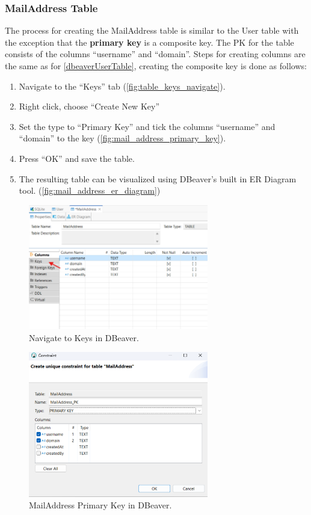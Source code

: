 \documentclass[a4paper,11pt,oneside]{article}
\begin{document}
\begin{sloppypar}
\subsubsection{MailAddress Table}
\label{dbeaverMailAddressTable}
The process for creating the MailAddress table is similar to the User table with the exception that the \textbf{primary key} is a composite key. The PK for the table consists of the columns ``username'' and ``domain''. Steps for creating columns are the same as for \ref{dbeaverUserTable}, creating the composite key is done as follows:
\begin{enumerate}
  \item Navigate to the ``Keys'' tab (\autoref{fig:table_keys_navigate}).
  \item Right click, choose ``Create New Key''
  \item Set the type to ``Primary Key'' and tick the columns ``username'' and ``domain'' to the key (\autoref{fig:mail_address_primary_key}).
  \item Press ``OK'' and save the table.
  \item The resulting table can be visualized using DBeaver's built in ER Diagram tool. (\autoref{fig:mail_address_er_diagram})
\end{enumerate}

\begin{figure}[!htb]
  \centering
  \includegraphics[width=0.7\textwidth]{dbeaver/table_keys_navigate.png}
  \caption{Navigate to Keys in DBeaver.}
  \label{fig:table_keys_navigate}
\end{figure}

\begin{figure}[!htb]
  \centering
  \includegraphics[width=0.7\textwidth]{dbeaver/mail_address_primary_key.png}
  \caption{MailAddress Primary Key in DBeaver.}
  \label{fig:mail_address_primary_key}
\end{figure}


\end{sloppypar}
\end{document}
